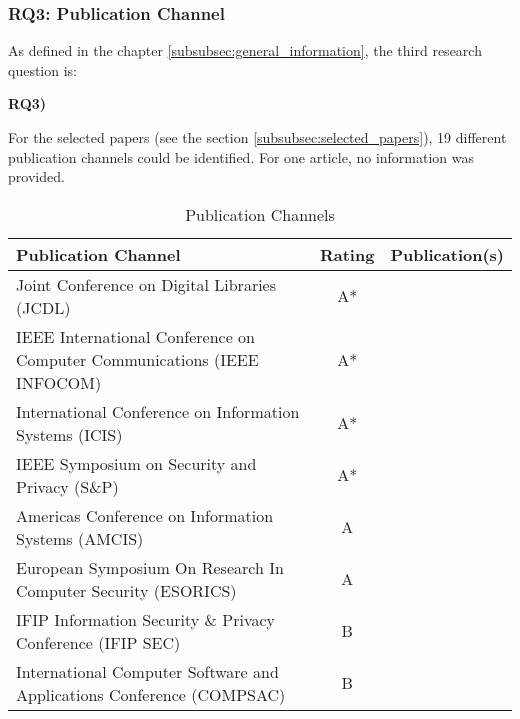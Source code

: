 \subsubsection{RQ3: Publication Channel}
\label{subsubsec:rq3_publication_channel}
As defined in the chapter \ref{subsubsec:general_information}, the third research question is:
\begin{displayquote}
\textbf{RQ3) }
\end{displayquote}
For the selected papers (see the section \ref{subsubsec:selected_papers}), 19 different publication channels could be identified. For one article, no information was provided.\\
\begin{longtable}{ |p{5cm}|c|c| }
\caption{Publication Channels} \label{my_label}\\
	\hline
 	Publication Channel & Rating &  Publication(s) \\ [0.5ex] 
 	\hline\hline
	 Joint Conference on Digital Libraries (JCDL) \nomenclature[P]{JCDL}{Joint Conference on Digital Libraries} & A* & \citet{2017_Gipp} \\ 
	 \hline
	 IEEE International Conference on Computer Communications (IEEE INFOCOM) \nomenclature[P]{IEEE INFOCOM}{IEEE International Conference on Computer Communications} & A* & \citet{2016_Kianmajd} \\ 
	 \hline
	 International Conference on Information Systems (ICIS) & A* & \citet{2017_Naerland} \\ 
	 \hline
	IEEE Symposium on Security and Privacy (S\&P)\nomenclature[P]{S\&P}{IEEE Symposium on Security and Privacy} & A* & \citet{2015_Zyskind} \\ 
	 \hline
 		Americas Conference on Information Systems (AMCIS)\nomenclature[P]{AMCIS}{Americas Conference on Information Systems}  & A & \citet{2017_Madhwal} \\ 
	 \hline
	 European Symposium On Research In Computer Security (ESORICS) \nomenclature[P]{ESORICS}{European Symposium On Research In Computer Security} & A & \citet{2017_Tackmann} \\ 
	 \hline
	 IFIP Information Security \& Privacy Conference (IFIP SEC) \nomenclature[P]{IFIP SEC}{IFIP Information Security \& Privacy Conference}& B & \citet{2016_Schaub} \\
	 \hline
	 International Computer Software and Applications Conference (COMPSAC)\nomenclature[P]{COMPSAC}{International Computer Software and Applications Conference}  & B & \citet{2016_Yasin} \\ 

\end{longtable}
